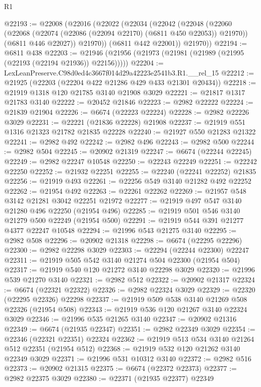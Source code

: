 \begin{lexlean}{R1}
\begin{coremodule}
@22193 := @22008
    (@22016
      (@22022
        (@22034
          (@22042
            (@22048
              (@22060
                (@22068 (@22074 (@22086 (@22094 @22170) (@6811 @450 @22053)) @21970))
                (@6811 @446 @22027))
              @21970))
          (@6811 @442 @22001))
        @21970))
@22194 := @6811 @438
@22203 := @21946 (@21956 (@21973 (@21981 (@21989 (@21995 (@22193 (@22194 @21936)) @22156)))))
@22204 := LexLeanPreserve.C98d0ed4c3667f014d29a42223e2541b3.R1.__rel_15
@22212 := @21925 (@22203 (@22204 @422 @21286 @429 @433 @21301 @20434))
@22218 := @21919 @1318 @120 @21785 @3140 @21908 @3029
@22221 := @21817 @1317 @21783 @3140
@22222 := @20452 @21846
@22223 := @2982 @22222
@22224 := @21839 @21904
@22226 := @6674 (@22223 @22224)
@22228 := @2982 @22226 @3029
@22231 := @22221 (@21836 @22228) @21908
@22237 := @21919 @551 @1316 @21323 @21782 @21835 @22228
@22240 := @21927 @550 @21283 @21322
@22241 := @2982 @492
@22242 := @2982 @496
@22243 := @2982 @500
@22244 := @2982 @504
@22245 := @20902 @21319
@22247 := @6674 (@22244 @22245)
@22249 := @2982 @22247 @10548
@22250 := @22243 @22249
@22251 := @22242 @22250
@22252 := @21932 @22251
@22255 := @22240 (@22241 @22252) @21835
@22256 := @21919 @493
@22261 := @22256 @549 @3140 @21282 @492 @22252
@22262 := @21954 @492
@22263 := @22261 @22262
@22269 := @21957 @548 @3142 @21281 @3042 @22251 @21972
@22277 := @21919 @497 @547 @3140 @21280 @496 @22250 (@21954 @496)
@22285 := @21919 @501 @546 @3140 @21279 @500 @22249 (@21954 @500)
@22291 := @21919 @544 @391 @21277 @4377 @22247 @10548
@22294 := @21996 @543 @21275 @3140
@22295 := @2982 @508
@22296 := @20902 @21318
@22298 := @6674 (@22295 @22296)
@22300 := @2982 @22298 @3029
@22303 := @22294 (@22244 @22300) @22247
@22311 := @21919 @505 @542 @3140 @21274 @504 @22300 (@21954 @504)
@22317 := @21919 @540 @120 @21272 @3140 @22298 @3029
@22320 := @21996 @539 @21270 @3140
@22321 := @2982 @512
@22322 := @20902 @21317
@22324 := @6674 (@22321 @22322)
@22326 := @2982 @22324 @3029
@22329 := @22320 (@22295 @22326) @22298
@22337 := @21919 @509 @538 @3140 @21269 @508 @22326 (@21954 @508)
@22343 := @21919 @536 @120 @21267 @3140 @22324 @3029
@22346 := @21996 @535 @21265 @3140
@22347 := @20902 @21316
@22349 := @6674 (@21935 @22347)
@22351 := @2982 @22349 @3029
@22354 := @22346 (@22321 @22351) @22324
@22362 := @21919 @513 @534 @3140 @21264 @512 @22351 (@21954 @512)
@22368 := @21919 @532 @120 @21262 @3140 @22349 @3029
@22371 := @21996 @531 @10312 @3140
@22372 := @2982 @516
@22373 := @20902 @21315
@22375 := @6674 (@22372 @22373)
@22377 := @2982 @22375 @3029
@22380 := @22371 (@21935 @22377) @22349

\end{coremodule}
\end{lexlean}
